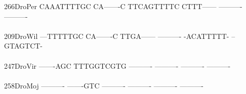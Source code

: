 \documentclass[11pt,twoside,reqno,a4paper]{article}
\begin{document}
{266\hspace*{1\charwidth}DroPer	CAAATTTTGC	CA-------C	TTCAGTTTTC	CTTT------	----------	----------	\\
\hspace*{4\charwidth}\hspace*{7\charwidth}\hspace*{1\charwidth}\hspace*{1\charwidth}\hspace*{1\charwidth}\hspace*{1\charwidth}\hspace*{1\charwidth}\hspace*{1\charwidth}\\
209\hspace*{1\charwidth}DroWil	---TTTTTGC	CA-------C	TTGA------	----------	-ACATTTTT-	--GTAGTCT-	\\
\hspace*{4\charwidth}\hspace*{7\charwidth}\hspace*{1\charwidth}\hspace*{1\charwidth}\hspace*{1\charwidth}\hspace*{1\charwidth}\hspace*{1\charwidth}\hspace*{1\charwidth}\\
247\hspace*{1\charwidth}DroVir	-------AGC	TTTGGTCGTG	----------	----------	----------	----------	\\
\hspace*{4\charwidth}\hspace*{7\charwidth}\hspace*{1\charwidth}\hspace*{1\charwidth}\hspace*{1\charwidth}\hspace*{1\charwidth}\hspace*{1\charwidth}\hspace*{1\charwidth}\\
258\hspace*{1\charwidth}DroMoj	----------	-------GTC	----------	----------	----------	----------	\\
\hspace*{4\charwidth}\hspace*{7\charwidth}\hspace*{1\charwidth}\hspace*{1\charwidth}\hspace*{1\charwidth}\hspace*{1\charwidth}\hspace*{1\charwidth}\hspace*{1\charwidth}\\
}
\end{document}
